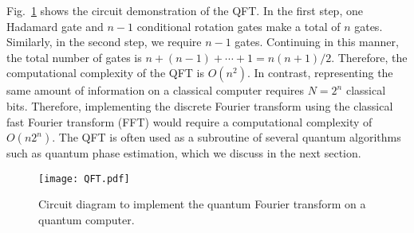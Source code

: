 \documentclass[10pt]{article}
\begin{document}
	Fig.~\ref{fig:1} shows the circuit demonstration of the QFT.  In the first step, one Hadamard gate and $n-1$ conditional rotation gates make a total of $n$ gates. Similarly, in the second step, we require $n-1$ gates. Continuing in this manner, the total number of gates is $n + (n-1) + \cdots + 1 = n(n+1)/2$. Therefore, the computational complexity of the QFT is $O(n^2)$. In contrast, representing the same amount of information on a classical computer requires $N=2^{n}$ classical bits. Therefore, implementing the discrete Fourier transform using the classical fast Fourier transform (FFT) would require a computational complexity of $O(n 2^n)$. The QFT is often used as a subroutine of several quantum algorithms such as quantum phase estimation, which we discuss in the next section.
	
	\begin{figure}[tb!]
		\centering
		\texttt{[image: QFT.pdf]}
		\caption{ Circuit diagram to implement the quantum Fourier transform on a quantum computer.}
		\label{fig:1}
	\end{figure}
	
\end{document}
